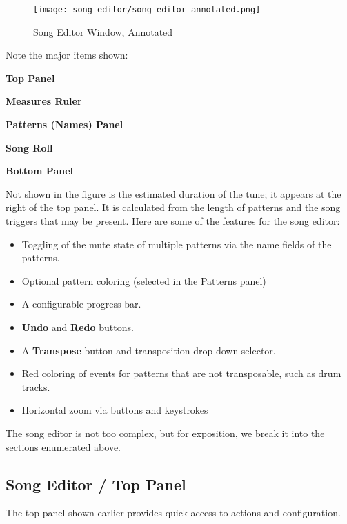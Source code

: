 \begin{figure}[H]
   \centering 
   \texttt{[image: song-editor/song-editor-annotated.png]}
   \caption{Song Editor Window, Annotated}
   \label{fig:song_editor_window_annotated}
\end{figure}

   Note the major items shown:

   \begin{enumber}
      \item \textbf{Top Panel}
      \item \textbf{Measures Ruler}
      \item \textbf{Patterns (Names) Panel}
      \item \textbf{Song Roll}
      \item \textbf{Bottom Panel}
   \end{enumber}

   Not shown in the figure is the estimated duration of the tune; it appears
   at the right of the top panel.  It is calculated from the length of patterns
   and the song triggers that may be present.
   Here are some of the features for the song editor:

   \begin{itemize}
      \item Toggling of the mute state of multiple patterns
         via the name fields of the patterns.
      \item Optional pattern coloring (selected in the Patterns panel)
      \item A configurable progress bar.
      \item \textbf{Undo} and \textbf{Redo} buttons.
      \item A \textbf{Transpose} button and transposition drop-down selector.
      \item Red coloring of events for patterns that are not transposable, such
         as drum tracks.
      \item Horizontal zoom via buttons and keystrokes
   \end{itemize}

   The song editor is not too complex, but for exposition, we break it into
   the sections enumerated above.

\subsection{Song Editor / Top Panel}
\label{subsec:song_editor_top}

   The top panel shown earlier provides quick access to actions
   and configuration.

